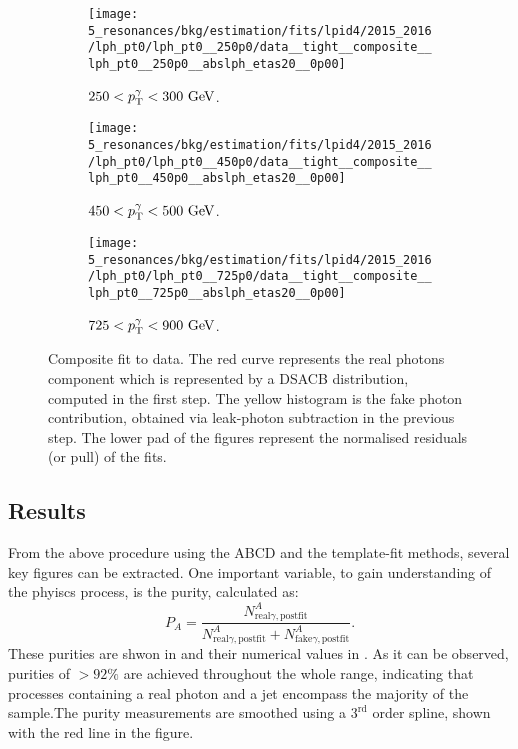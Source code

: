 \begin{enumerate}
        \begin{figure}[bth!]
            \centering
            \begin{subfigure}[h]{0.32\linewidth}
                \centering
                \texttt{[image: 5\_resonances/bkg/estimation/fits/lpid4/2015\_2016/lph\_pt0/lph\_pt0\_\_250p0/data\_\_tight\_\_composite\_\_lph\_pt0\_\_250p0\_\_abslph\_etas20\_\_0p00]}
                \caption{\(250 < p_{\text{T}}^{\gamma} < 300~\text{GeV}\).}
            \end{subfigure}
            \begin{subfigure}[h]{0.32\linewidth}
                \centering
                \texttt{[image: 5\_resonances/bkg/estimation/fits/lpid4/2015\_2016/lph\_pt0/lph\_pt0\_\_450p0/data\_\_tight\_\_composite\_\_lph\_pt0\_\_450p0\_\_abslph\_etas20\_\_0p00]}
                \caption{\(450 < p_{\text{T}}^{\gamma} < 500~\text{GeV}\).}
            \end{subfigure}
            \begin{subfigure}[h]{0.32\linewidth}
                \centering
                \texttt{[image: 5\_resonances/bkg/estimation/fits/lpid4/2015\_2016/lph\_pt0/lph\_pt0\_\_725p0/data\_\_tight\_\_composite\_\_lph\_pt0\_\_725p0\_\_abslph\_etas20\_\_0p00]}
                \caption{\(725 < p_{\text{T}}^{\gamma} < 900~\text{GeV}\).}
            \end{subfigure}
            \caption{Composite fit to data. The red curve represents the real photons component which is represented by a \ac{DSACB} distribution, computed in the first step. The yellow histogram is the fake photon contribution, obtained via leak-photon subtraction in the previous step. The lower pad of the figures represent the normalised residuals (or pull) of the fits.}
            \label{fig:bkg:estimation:fits_tightID_data}
        \end{figure}
\end{enumerate}





\subsection{Results}
\label{subsec:bkg:estimation:results}

From the above procedure using the ABCD and the template-fit methods, several key figures can be extracted. One important variable, to gain understanding of the phyiscs process, is the \gammajet purity, calculated as:
\[
    P_A = \frac{
        N^{A}_{\text{real}\gamma, \text{postfit}}
    }{
        N^{A}_{\text{real}\gamma, \text{postfit}} + N^{A}_{\text{fake}\gamma, \text{postfit}}
    }.
\]
These purities are shwon in \Fig{\ref{fig:bkg:estimation:results:results:purities}} and their numerical values in \Tab{\ref{tab:bkg:estimation:results:ffiso_purity_values}}. As it can be observed, purities of \(>92\%\) are achieved throughout the whole \ptgam range, indicating that processes containing a real photon and a jet encompass the majority of the sample.The purity measurements are smoothed using a \(3^{\text{rd}}\) order spline, shown with the red line in the figure.


